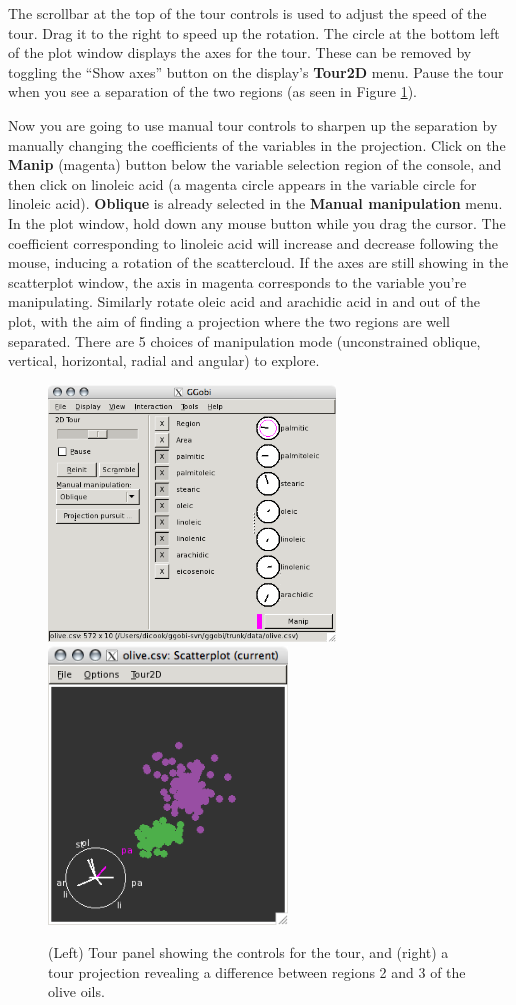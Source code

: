 \documentclass[11pt]{article}
\def\Widget#1{\textbf{#1}}
\begin{document}
The scrollbar at the top of the tour controls is used to adjust the
speed of the tour.  Drag it to the right to speed up the rotation.
The circle at the bottom left of the plot window displays the axes for
the tour. These can be removed by toggling the ``Show axes'' button on
the display's \Widget{Tour2D} menu.  Pause the tour when you see a
separation of the two regions (as seen in Figure \ref{fig6}).

Now you are going to use manual tour controls to sharpen up the
separation by manually changing the coefficients of the variables in
the projection.  Click on the \Widget{Manip} (magenta) button below
the variable selection region of the console, and then click on
linoleic acid (a magenta circle appears in the variable circle for
linoleic acid).  \Widget{Oblique} is already selected in the
\Widget{Manual manipulation} menu.  In the plot window, hold down any
mouse button while you drag the cursor. The coefficient corresponding
to linoleic acid will increase and decrease following the mouse,
inducing a rotation of the scattercloud.  If the axes are still
showing in the scatterplot window, the axis in magenta corresponds to
the variable you're manipulating.  Similarly rotate oleic acid and
arachidic acid in and out of the plot, with the aim of finding a
projection where the two regions are well separated.  There are 5
choices of manipulation mode (unconstrained oblique, vertical,
horizontal, radial and angular) to explore.

\begin{figure}[htp]
\centerline{\includegraphics[width=3in]{Figures/olive-tourpanel.png}\hspace{0.2in}\includegraphics[width=2.5in]{Figures/olive-tour1.png}}
\caption{(Left) Tour panel showing the controls for the tour, and
(right) a tour projection revealing a difference between regions 2 and
3 of the olive oils.}
\label{fig6}
\end{figure}
\end{document}
